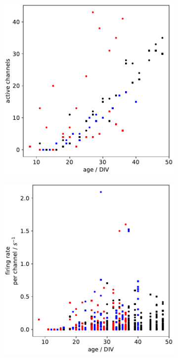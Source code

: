 \documentclass[10pt]{article}
\begin{document}
\begin{figure}
\begin{subfigure}[b]{0.45\textwidth}
	\centering
	\includegraphics[width=\textwidth]{../plots/development_plots_channels.pdf}
\end{subfigure}
\hfill
\begin{subfigure}[b]{0.45\textwidth}
	\centering
	\includegraphics[width=\textwidth]{../plots/development_plots_fr_perchan.pdf}
\end{subfigure}


\end{figure}
\end{document}
